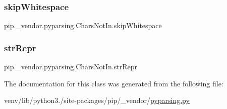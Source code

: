 \subsubsection{\texorpdfstring{skip\+Whitespace}{skipWhitespace}}
{\footnotesize\ttfamily pip.\+\_\+vendor.\+pyparsing.\+Chars\+Not\+In.\+skip\+Whitespace}

\mbox{\label{classpip_1_1__vendor_1_1pyparsing_1_1CharsNotIn_a150902ed98aaac4cf12c5652eb0267f2}} 
\subsubsection{\texorpdfstring{str\+Repr}{strRepr}}
{\footnotesize\ttfamily pip.\+\_\+vendor.\+pyparsing.\+Chars\+Not\+In.\+str\+Repr}



The documentation for this class was generated from the following file\+:\begin{DoxyCompactItemize}
\item 
venv/lib/python3./site-\/packages/pip/\+\_\+vendor/\hyperlink{pip_2__vendor_2pyparsing_8py}{pyparsing.\+py}\end{DoxyCompactItemize}
